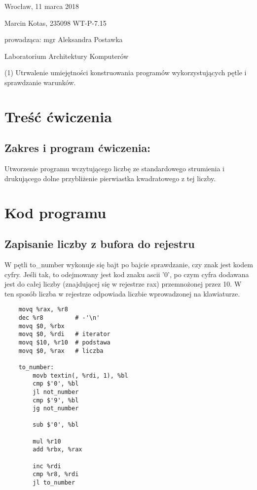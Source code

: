 \documentclass[polish, 11pt]{article}
\begin{document}
	\begin{flushright}
		Wrocław, 11 marca 2018
	\end{flushright}
	
	Marcin Kotas, 235098
	WT-P-7.15
	
	\begin{flushright}
		prowadząca: mgr Aleksandra Postawka
	\end{flushright}
	
	\begin{center}
		Laboratorium Architektury Komputerów
	
		(1)	Utrwalenie umiejętności konstruowania programów wykorzystujących pętle i sprawdzanie warunków.
	\end{center}
	
	\section{Treść ćwiczenia}
	\subsection*{Zakres i program ćwiczenia:}
		Utworzenie programu wczytującego liczbę ze standardowego strumienia
		i drukującego dolne przybliżenie pierwiastka kwadratowego z tej liczby.
		
	\section{Kod programu}
	\subsection{Zapisanie liczby z bufora do rejestru}
		
		\begin{minipage}{.4\textwidth}
			W pętli to\_number wykonuje się bajt po bajcie sprawdzanie, czy znak jest kodem cyfry.
			Jeśli tak, to odejmowany jest kod znaku ascii '0',
			po czym cyfra dodawana jest do całej liczby (znajdującej się w rejestrze rax)
			przemnożonej przez 10.
			W ten sposób liczba w rejestrze odpowiada liczbie wprowadzonej na klawiaturze.

		\end{minipage}%
		\hspace{1cm}
		\begin{minipage}{.5\textwidth}	%
			\begin{lstlisting}	
    movq %rax, %r8
    dec %r8        	# -'\n'
    movq $0, %rbx	
    movq $0, %rdi	# iterator
    movq $10, %r10	# podstawa
    movq $0, %rax	# liczba 

    to_number:
        movb textin(, %rdi, 1), %bl
        cmp $'0', %bl
        jl not_number
        cmp $'9', %bl
        jg not_number

        sub $'0', %bl

        mul %r10
        add %rbx, %rax

        inc %rdi
        cmp %r8, %rdi
        jl to_number
			\end{lstlisting}	%
		\end{minipage}
\end{document}
